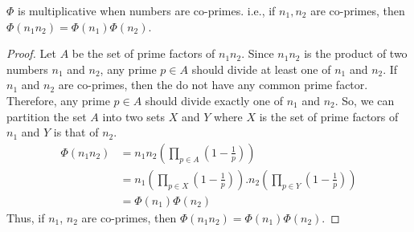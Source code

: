\vspace{.5cm}
\noindent
\begin{corollary}$\Phi$ is multiplicative when numbers are co-primes. i.e., if $n_1, n_2$ are co-primes, then $\Phi(n_1 n_2) = \Phi(n_1) \Phi(n_2)$.
\end{corollary}
\begin{proof}
Let $A$ be the set of prime factors of $n_1n_2$. Since $n_1n_2$ is the product of two numbers $n_1$ and $n_2$, any prime $p \in A$ should divide at least one of $n_1$ and $n_2$. If $n_1$ and $n_2$ are co-primes, then the do not have any common prime factor. Therefore, any prime $p \in A$ should divide exactly one of $n_1$ and $n_2$. So, we can partition the set $A$ into two sets $X$ and $Y$ where $X$ is the set of prime factors of $n_1$ and $Y$ is that of $n_2$.
\begin{align*}
    \Phi(n_1n_2) &= n_1 n_2  (\prod_{p \in A}(1-\frac{1}{p}))\\
    &= n_1 (\prod_{p\in X}(1-\frac{1}{p})). n_2 (\prod_{p\in Y}(1-\frac{1}{p}))\\
    &= \Phi(n_1) \Phi(n_2)
\end{align*}
Thus, if $n_1$, $n_2$ are co-primes, then $\Phi(n_1 n_2) = \Phi(n_1) \Phi(n_2)$. \end{proof}


